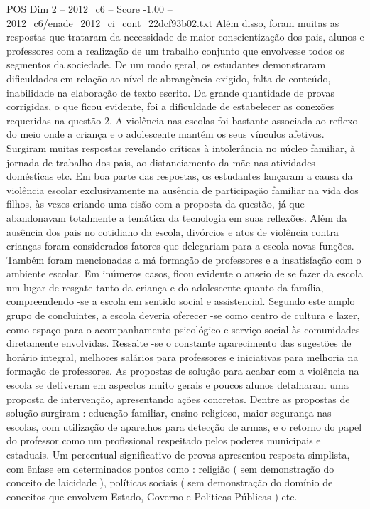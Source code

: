 \begin{textsample}{POS Dim 2 – 2012\_c6 – Score -1.00 – 2012\_c6/enade\_2012\_ci\_cont\_22dcf93b02.txt}
Além disso, foram muitas as respostas que trataram da necessidade de maior conscientização dos pais, alunos e professores com a realização de um trabalho conjunto que envolvesse todos os segmentos da sociedade.
De um modo geral, os estudantes demonstraram dificuldades em relação ao nível de abrangência exigido, falta de conteúdo, inabilidade na elaboração de texto escrito.
Da grande quantidade de provas corrigidas, o que ficou evidente, foi a dificuldade de estabelecer as conexões requeridas na questão 2.
A violência nas escolas foi bastante associada ao reflexo do meio onde a criança e o adolescente mantém os seus vínculos afetivos.
Surgiram muitas respostas revelando críticas à intolerância no núcleo familiar, à jornada de trabalho dos pais, ao distanciamento da mãe nas atividades domésticas etc.
Em boa parte das respostas, os estudantes lançaram a causa da violência escolar exclusivamente na ausência de participação familiar na vida dos filhos, às vezes criando uma cisão com a proposta da questão, já que abandonavam totalmente a temática da tecnologia em suas reflexões.
Além da ausência dos pais no cotidiano da escola, divórcios e atos de violência contra crianças foram considerados fatores que delegariam para a escola novas funções.
Também foram mencionadas a má formação de professores e a insatisfação com o ambiente escolar.
Em inúmeros casos, ficou evidente o anseio de se fazer da escola um lugar de resgate tanto da criança e do adolescente quanto da família, compreendendo -se a escola em sentido social e assistencial.
Segundo este amplo grupo de concluintes, a escola deveria oferecer -se como centro de cultura e lazer, como espaço para o acompanhamento psicológico e serviço social às comunidades diretamente envolvidas.
Ressalte -se o constante aparecimento das sugestões de horário integral, melhores salários para professores e iniciativas para melhoria na formação de professores.
As propostas de solução para acabar com a violência na escola se detiveram em aspectos muito gerais e poucos alunos detalharam uma proposta de intervenção, apresentando ações concretas.
Dentre as propostas de solução surgiram : educação familiar, ensino religioso, maior segurança nas escolas, com utilização de aparelhos para detecção de armas, e o retorno do papel do professor como um profissional respeitado pelos poderes municipais e estaduais.
Um percentual significativo de provas apresentou resposta simplista, com ênfase em determinados pontos como : religião ( sem demonstração do conceito de laicidade ), políticas sociais ( sem demonstração do domínio de conceitos que envolvem Estado, Governo e Politicas Públicas ) etc.

\end{textsample}
